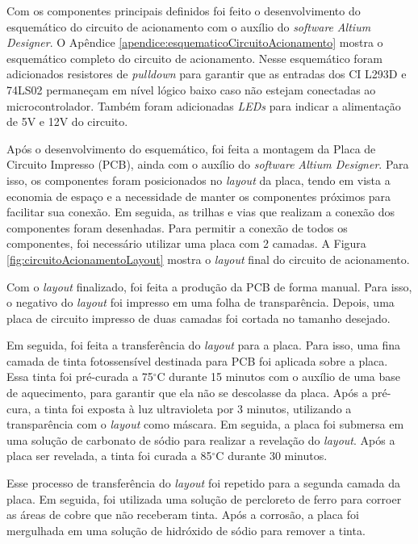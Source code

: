 Com os componentes principais definidos foi feito o desenvolvimento do esquemático do circuito de acionamento com o auxílio do \textit{software} \textit{Altium Designer}.
O Apêndice \ref{apendice:esquematicoCircuitoAcionamento} mostra o esquemático completo do circuito de acionamento.
Nesse esquemático foram adicionados resistores de \textit{pulldown} para garantir que as entradas dos CI L293D e 74LS02 permaneçam em nível lógico baixo caso não estejam conectadas ao microcontrolador.
Também foram adicionadas \textit{LEDs} para indicar a alimentação de 5V e 12V do circuito.

Após o desenvolvimento do esquemático, foi feita a montagem da Placa de Circuito Impresso (PCB), ainda com o auxílio do \textit{software} \textit{Altium Designer}.
Para isso, os componentes foram posicionados no \textit{layout} da placa, tendo em vista a economia de espaço e a necessidade de manter os componentes próximos para facilitar sua conexão.
Em seguida, as trilhas e vias que realizam a conexão dos componentes foram desenhadas. 
Para permitir a conexão de todos os componentes, foi necessário utilizar uma placa com 2 camadas.
A Figura \ref{fig:circuitoAcionamentoLayout} mostra o \textit{layout} final do circuito de acionamento.

Com o \textit{layout} finalizado, foi feita a produção da PCB de forma manual.
Para isso, o negativo do \textit{layout} foi impresso em uma folha de transparência.
Depois, uma placa de circuito impresso de duas camadas foi cortada no tamanho desejado.

Em seguida, foi feita a transferência do \textit{layout} para a placa.
Para isso, uma fina camada de tinta fotossensível destinada para PCB foi aplicada sobre a placa.
Essa tinta foi pré-curada a 75$^{\circ}$C durante 15 minutos com o auxílio de uma base de aquecimento, para garantir que ela não se descolasse da placa.
Após a pré-cura, a tinta foi exposta à luz ultravioleta por 3 minutos, utilizando a transparência com o \textit{layout} como máscara.
Em seguida, a placa foi submersa em uma solução de carbonato de sódio para realizar a revelação do \textit{layout}.
Após a placa ser revelada, a tinta foi curada a 85$^{\circ}$C durante 30 minutos.

Esse processo de transferência do \textit{layout} foi repetido para a segunda camada da placa.
Em seguida, foi utilizada uma solução de percloreto de ferro para corroer as áreas de cobre que não receberam tinta.
Após a corrosão, a placa foi mergulhada em uma solução de hidróxido de sódio para remover a tinta.

